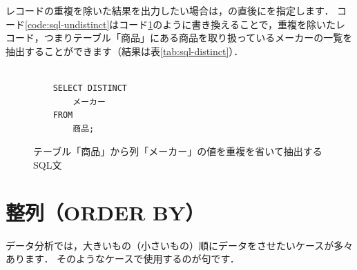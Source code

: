 レコードの重複を除いた結果を出力したい場合は，の直後にを指定します．
コード\ref{code:sql-undistinct}はコード\ref{code:sql-distinct}のように書き換えることで，重複を除いたレコード，つまりテーブル「商品」にある商品を取り扱っているメーカーの一覧を抽出することができます（結果は表\ref{tab:sql-distinct}）．
\begin{figure}[!htbp]
    \begin{verbatim}

    SELECT DISTINCT
        メーカー
    FROM
        商品;

    \end{verbatim}
    \captionsetup{name=コード}
    \caption{テーブル「商品」から列「メーカー」の値を重複を省いて抽出するSQL文}
    \label{code:sql-distinct}
\end{figure}
\begin{table}[!htbp]
    \centering
    \caption{テーブル「商品」から列「メーカー」の値を重複を省いて抽出した結果}
    \label{tab:sql-distinct}
\end{table}



\section{整列（ORDER BY）}
データ分析では，大きいもの（小さいもの）順にデータをさせたいケースが多々あります．
そのようなケースで使用するのが句です．


